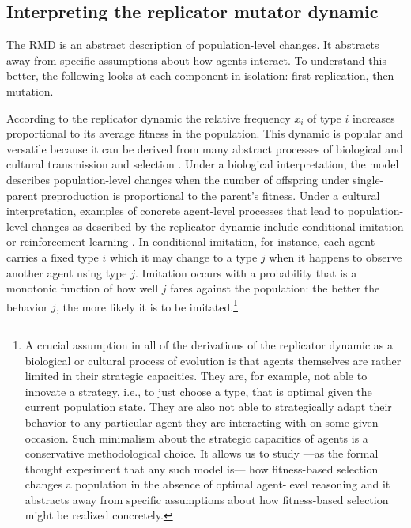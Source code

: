 \documentclass[a4paper, 11pt]{article}
\theoremstyle{Satz}
\begin{document}
\subsection{Interpreting the replicator mutator dynamic}

The RMD is an abstract description of population-level changes. It abstracts away from specific
assumptions about how agents interact. To understand this better, the following looks at each
component in isolation: first replication, then mutation.

According to the replicator dynamic the relative frequency $x_i$ of type $i$ increases
proportional to its average fitness in the population. This dynamic is popular and versatile
because it can be derived from many abstract processes of biological and cultural transmission
and selection \citep[for overview and several derivations
see][]{Sandholm2010:Population-Game}. Under a biological interpretation, the model describes
population-level changes when the number of offspring under single-parent preproduction is
proportional to the parent's fitness. Under a cultural interpretation, examples of concrete
agent-level processes that lead to population-level changes as described by the replicator
dynamic include conditional imitation
\citep[e.g.,][]{Helbing1996:A-Stochastic-Be,Schlag1998:Why-Imitate-and} or reinforcement
learning \citep[e.g.,][]{BorgersSarin997:Learning-Throug,Beggs2005:On-the-Converge}. In
conditional imitation, for instance, each agent carries a fixed type $i$ which it may change to
a type $j$ when it happens to observe another agent using type $j$. Imitation occurs with a
probability that is a monotonic function of how well $j$ fares against the population: the
better the behavior $j$, the more likely it is to be imitated.\footnote{A crucial assumption in
  all of the derivations of the replicator dynamic as a biological or cultural process of
  evolution is that agents themselves are rather limited in their strategic capacities. They
  are, for example, not able to innovate a strategy, i.e., to just choose a type, that is
  optimal given the current population state. They are also not able to strategically adapt
  their behavior to any particular agent they are interacting with on some given occasion. Such
  minimalism about the strategic capacities of agents is a conservative methodological
  choice. It allows us to study ---as the formal thought experiment that any such model is---
  how fitness-based selection changes a population in the absence of optimal agent-level
  reasoning and it abstracts away from specific assumptions about how fitness-based selection
  might be realized concretely.}
\end{document}
